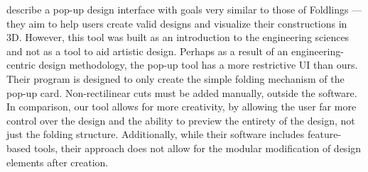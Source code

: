 \citet{hendrix2006computer} describe a pop-up design interface with
goals very similar to those of Foldlings --- they aim to help users
create valid designs and visualize their constructions in 3D. However,
this tool was built as an introduction to the engineering sciences and
not as a tool to aid artistic design. Perhaps as a result of an
engineering-centric design methodology, the pop-up tool has a more
restrictive UI than ours. Their program is designed to only create the
simple folding mechanism of the pop-up card. Non-rectilinear cuts must
be added manually, outside the software. In comparison, our tool allows
for more creativity, by allowing the user far more control over the
design and the ability to preview the entirety of the design, not just
the folding structure. Additionally, while their software includes
feature-based tools, their approach does not allow for the modular
modification of design elements after creation.
